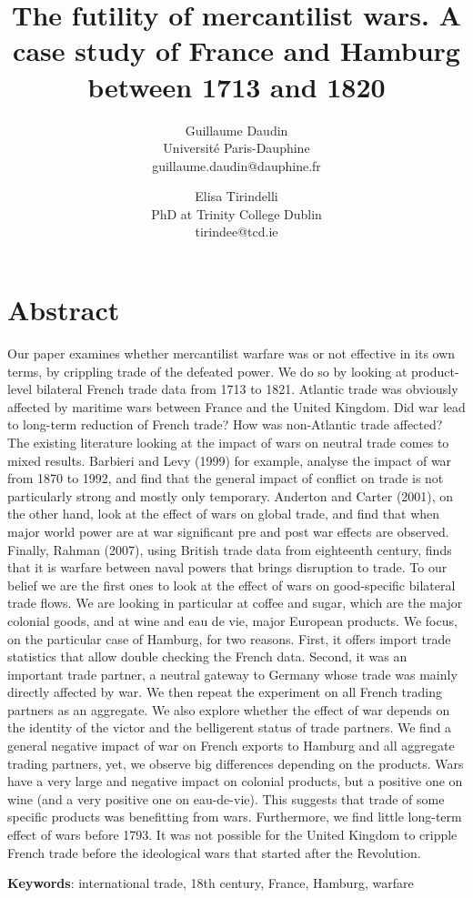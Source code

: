\documentclass[12pt,a4paper,notitlepage]{article}
\begin{document}
\title{The futility of mercantilist wars. A case study of France and Hamburg between 1713 and 1820}
\author{
  Guillaume Daudin \\ Université Paris-Dauphine \\guillaume.daudin@dauphine.fr		
  \and
  Elisa Tirindelli \\ PhD at Trinity College Dublin  \\ tirindee@tcd.ie
}
\maketitle

\section*{Abstract}
Our paper examines whether mercantilist warfare was or not effective in its own terms, by crippling trade of the defeated power. We do so by looking at product-level bilateral French  trade data from 1713 to 1821. Atlantic trade was obviously affected by maritime wars between France and the United Kingdom. Did war lead to long-term reduction of French trade? How was non-Atlantic trade affected?
The existing literature looking at the impact of wars on neutral trade comes to mixed results. Barbieri and Levy (1999) for example, analyse the impact of war from 1870 to 1992, and find that the general impact of conflict on trade is not particularly strong and mostly only temporary. Anderton and Carter (2001), on the other hand, look at the effect of wars on global trade, and find that when major world power are at war significant pre and post war effects are observed. Finally, Rahman (2007), using British trade data from eighteenth century, finds that it is warfare between naval powers that brings disruption to trade. 
To our belief we are the first ones to look at the effect of wars on good-specific bilateral trade flows. We are looking in particular at coffee and sugar, which are the major colonial goods, and at wine and eau de vie, major European products. We focus, on the particular case of Hamburg, for two reasons. First, it offers import trade statistics that allow double checking the French data. Second, it was an important trade partner, a neutral gateway to Germany whose trade was mainly directly affected by war. We then repeat the experiment on all French trading partners as an aggregate. We also explore whether the effect of war depends on the identity of the victor and the belligerent status of trade partners.
We find a general negative impact of war on French exports to Hamburg and all aggregate trading partners, yet, we observe big differences depending on the products. Wars have a very large and negative impact on colonial products, but a positive one on wine (and a very positive one on eau-de-vie). This suggests that trade of some specific products was benefitting from wars. Furthermore, we find little long-term effect of wars before 1793. It was not possible for the United Kingdom to cripple French trade before the ideological wars that started after the Revolution. 

\textbf{Keywords}: international trade, 18th century, France, Hamburg, warfare
\end{document}
